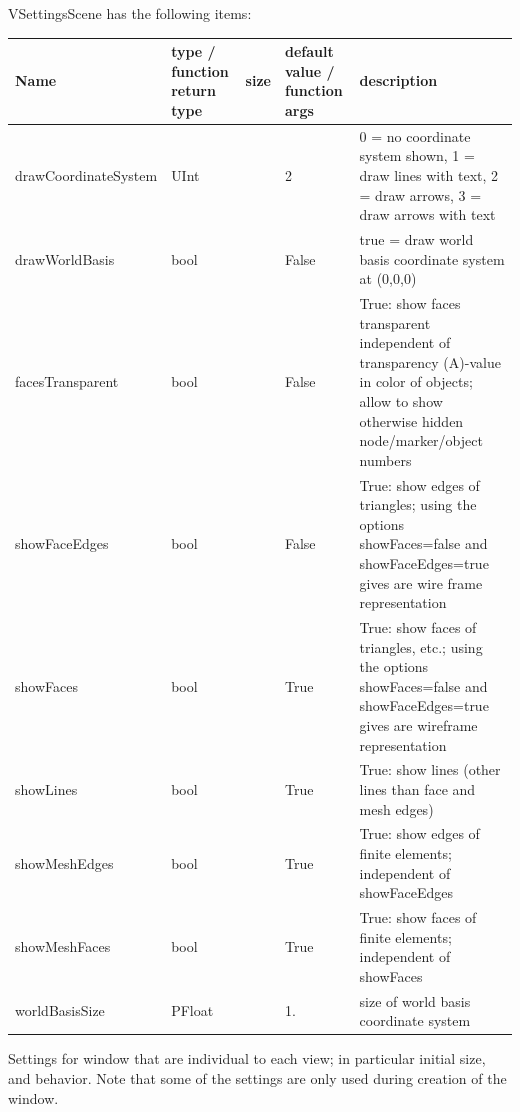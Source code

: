 \noindent VSettingsScene has the following items:
\begin{center}
  \footnotesize
  \begin{longtable}{| p{4.2cm} | p{2.5cm} | p{0.3cm} | p{3.0cm} | p{6cm} |}
    \hline
    \bf Name & \bf type / function return type & \bf size & \bf default value / function args & \bf description \\ \hline
    drawCoordinateSystem &     UInt &      &     2 &     0 = no coordinate system shown, 1 = draw lines with text, 2 = draw arrows, 3 = draw arrows with text\\ \hline
    drawWorldBasis &     bool &      &     False &     true = draw world basis coordinate system at (0,0,0)\\ \hline
    facesTransparent &     bool &      &     False &     True: show faces transparent independent of transparency (A)-value in color of objects; allow to show otherwise hidden node/marker/object numbers\\ \hline
    showFaceEdges &     bool &      &     False &     True: show edges of triangles; using the options showFaces=false and showFaceEdges=true gives are wire frame representation\\ \hline
    showFaces &     bool &      &     True &     True: show faces of triangles, etc.; using the options showFaces=false and showFaceEdges=true gives are wireframe representation\\ \hline
    showLines &     bool &      &     True &     True: show lines (other lines than face and mesh edges)\\ \hline
    showMeshEdges &     bool &      &     True &     True: show edges of finite elements; independent of showFaceEdges\\ \hline
    showMeshFaces &     bool &      &     True &     True: show faces of finite elements; independent of showFaces\\ \hline
    worldBasisSize &     PFloat &      &     1. &     size of world basis coordinate system\\ \hline
	  \end{longtable}
	\end{center}



\label{sec:VSettingsWindow}
Settings for window that are individual to each view; in particular initial size, and behavior. Note that some of the settings are only used during creation of the window. 


